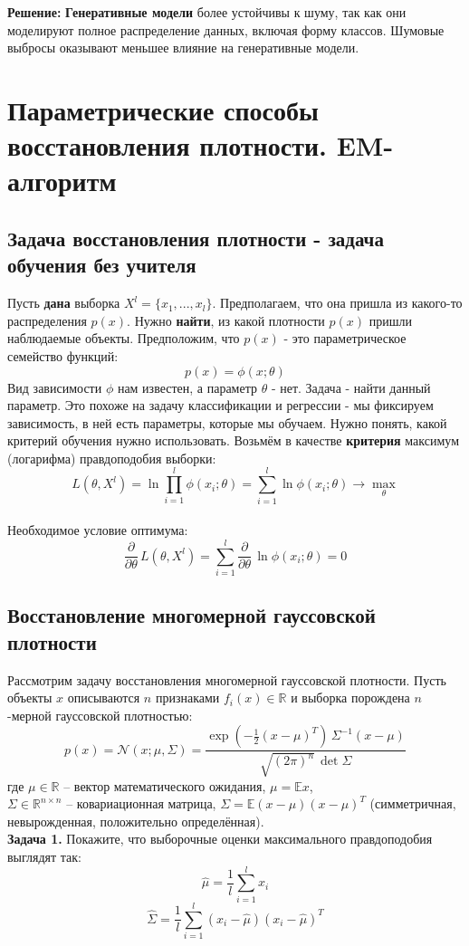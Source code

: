 \textbf{Решение:} \textbf{Генеративные модели} более устойчивы к шуму, так как они моделируют полное распределение данных, включая форму классов. Шумовые выбросы оказывают меньшее влияние на генеративные модели.


\section{Параметрические способы восстановления плотности. EM-алгоритм}
\subsection{Задача восстановления плотности - задача обучения без учителя}

Пусть \textbf{дана} выборка $X^l = \{x_1,...,x_l\}$. Предполагаем, что она пришла из какого-то распределения $p(x)$. Нужно \textbf{найти}, из какой плотности  $p(x)$ пришли наблюдаемые объекты. Предположим, что $p(x)$ - это параметрическое семейство функций:
$$p(x) = \phi(x;\theta)$$
Вид зависимости $\phi$ нам известен, а параметр $\theta$ - нет. Задача - найти данный параметр.
Это похоже на задачу классификации и регрессии - мы фиксируем зависимость, в ней есть параметры, которые мы обучаем.
Нужно понять, какой критерий обучения нужно использовать.
Возьмём в качестве \textbf{критерия} максимум (логарифма) правдоподобия выборки:
$$L(\theta, X^l) = \ln \prod_{i=1}^l \phi(x_i; \theta) = \sum_{i=1}^l \ln \phi(x_i;\theta) \to \max_\theta $$
\\
Необходимое условие оптимума:
$$\frac{\partial}{\partial \theta} \, L(\theta, X^l) = \sum_{i=1}^l \frac{\partial}{\partial \theta}\,  \ln \phi(x_i;\theta) = 0$$
\subsection{Восстановление многомерной гауссовской плотности}
Рассмотрим задачу восстановления многомерной гауссовской плотности.
Пусть объекты $x$ описываются $n$ признаками $f_i(x)\in \mathbb{R}$ и выборка порождена $n$-мерной гауссовской плотностью:
$$p(x) = \mathcal{N}(x;\mu,\Sigma) = \frac{\exp(-\frac{1}{2}(x-\mu)^T)\,\Sigma^{-1}(x-\mu)}{\sqrt{(2\pi)^n}\,\det \Sigma}$$
где $\mu\in \mathbb{R}$ -- вектор математического ожидания, $\mu=\mathbb{E}x$,\\ $\Sigma \in \mathbb{R}^{n\times n}$ -- ковариационная матрица, $\Sigma = \mathbb{E}(x-\mu)(x-\mu)^T$ (симметричная, невырожденная, положительно определённая).
\\[\bigskipamount]
\textbf{Задача 1.} Покажите, что выборочные оценки максимального правдоподобия выглядят так:
$$\hat{\mu} = \frac{1}{l} \sum_{i=1}^l x_i$$
$$\hat{\Sigma} = \frac{1}{l}\sum_{i=1}^l (x_i - \hat{\mu})(x_i - \hat{\mu})^T$$
\\[\bigskipamount]


